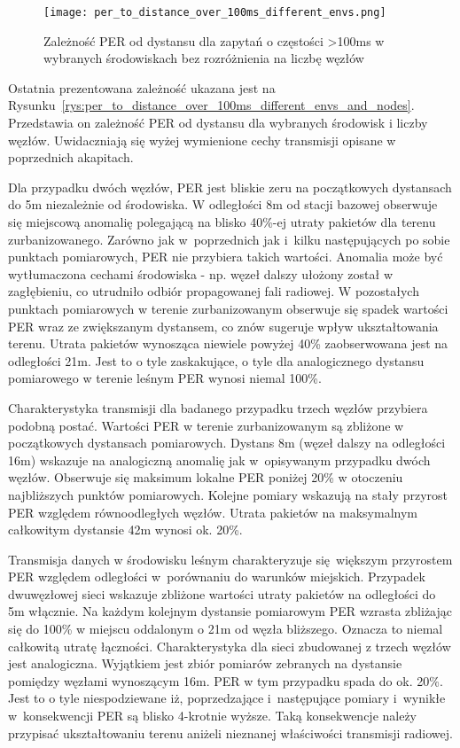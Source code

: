 \begin{figure}[!htb]
	\centering \texttt{[image: per\_to\_distance\_over\_100ms\_different\_envs.png]} 
	\caption{Zależność \gls{PER} od dystansu dla zapytań o częstości >100ms w wybranych środowiskach bez rozróżnienia na liczbę węzłów}
	\label{rys:per_to_distance_over_100ms_different_envs}
\end{figure}

Ostatnia prezentowana zależność ukazana jest na Rysunku~\ref{rys:per_to_distance_over_100ms_different_envs_and_nodes}.
Przedstawia on zależność PER od dystansu dla wybranych środowisk i liczby węzłów. Uwidaczniają się wyżej wymienione
cechy transmisji opisane w poprzednich akapitach.

Dla przypadku dwóch węzłów, PER jest bliskie zeru na początkowych dystansach do 5m niezależnie od środowiska. W odległości 8m
od stacji bazowej obserwuje się miejscową anomalię polegającą na blisko 40\%-ej utraty pakietów dla terenu zurbanizowanego.
Zarówno jak w~poprzednich jak i~kilku następujących po sobie punktach pomiarowych, PER nie przybiera takich wartości. Anomalia może
być wytłumaczona cechami środowiska - np. węzeł dalszy ułożony został w zagłębieniu, co utrudniło odbiór propagowanej fali
radiowej. W pozostałych punktach pomiarowych w terenie zurbanizowanym obserwuje się spadek wartości PER wraz ze zwiększanym dystansem,
co znów sugeruje wpływ ukształtowania terenu. Utrata pakietów wynosząca niewiele powyżej 40\% zaobserwowana jest na odległości
21m. Jest to o tyle zaskakujące, o tyle dla analogicznego dystansu pomiarowego w terenie leśnym PER wynosi niemal 100\%.

Charakterystyka transmisji dla badanego przypadku trzech węzłów przybiera podobną postać. Wartości PER w terenie zurbanizowanym są zbliżone
w początkowych dystansach pomiarowych. Dystans 8m (węzeł dalszy na odległości 16m) wskazuje na analogiczną anomalię jak w~opisywanym
przypadku dwóch węzłów. Obserwuje się maksimum lokalne PER poniżej 20\% w otoczeniu najbliższych punktów pomiarowych. Kolejne pomiary
wskazują na stały przyrost PER względem równoodległych węzłów. Utrata pakietów na maksymalnym całkowitym dystansie 42m wynosi ok. 20\%.

Transmisja danych w środowisku leśnym charakteryzuje się większym przyrostem PER względem odległości w~porównaniu do warunków miejskich.
Przypadek dwuwęzłowej sieci wskazuje zbliżone wartości utraty pakietów na odległości do 5m włącznie. Na każdym kolejnym dystansie
pomiarowym PER wzrasta zbliżając się do 100\% w miejscu oddalonym o 21m od węzła bliższego. Oznacza to niemal całkowitą utratę łączności.
Charakterystyka dla sieci zbudowanej z trzech węzłów jest analogiczna. Wyjątkiem jest zbiór pomiarów zebranych na dystansie pomiędzy węzłami
wynoszącym 16m. PER w tym przypadku spada do ok. 20\%. Jest to o tyle niespodziewane iż, poprzedzające i~następujące pomiary i~wynikłe
w~konsekwencji PER są blisko 4-krotnie wyższe. Taką konsekwencje należy przypisać ukształtowaniu terenu aniżeli nieznanej właściwości
transmisji radiowej.

